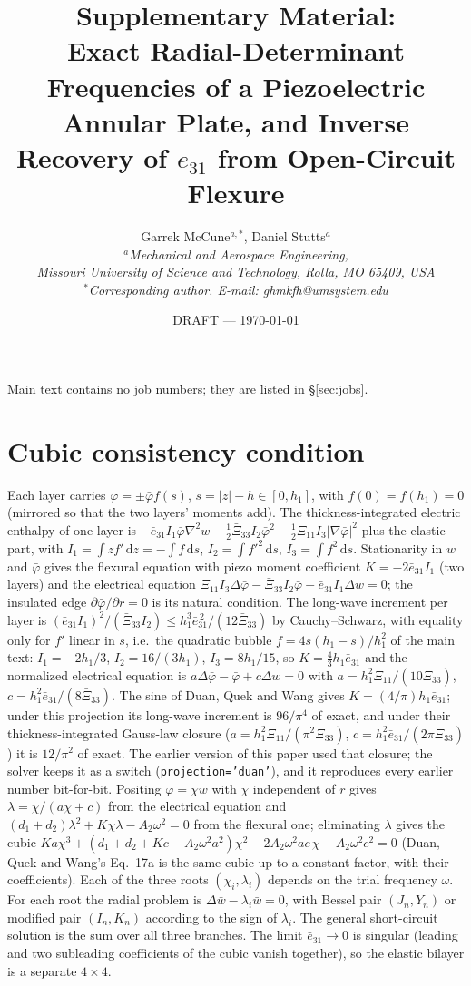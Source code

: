 \documentclass[11pt]{article}
\title{\bfseries Supplementary Material:\\
Exact Radial-Determinant Frequencies of a Piezoelectric Annular Plate,
and Inverse Recovery of $e_{31}$ from Open-Circuit Flexure}
\author{Garrek McCune$^{a,*}$, Daniel Stutts$^{a}$\\
\small\itshape $^a$Mechanical and Aerospace Engineering,\\
Missouri University of Science and Technology, Rolla, MO 65409, USA\\
\small\upshape $^*$Corresponding author. E-mail: ghmkfh@umsystem.edu}
\date{DRAFT --- \today}
\newcommand{\eebar}{\bar{e}_{31}}
\newcommand{\Xibar}{\bar{\Xi}_{33}}
\begin{document}
\maketitle
\noindent Main text contains no job numbers; they are listed in
\S\ref{sec:jobs}.

\section{Cubic consistency condition}
\label{sec:s1}
Each layer carries $\varphi=\pm\bar\varphi f(s)$, $s=\lvert z\rvert-h\in[0,h_1]$,
with $f(0)=f(h_1)=0$ (mirrored so that the two layers' moments add). The
thickness-integrated electric enthalpy of one layer is
$-\eebar I_1\bar\varphi\nabla^2w-\tfrac12\Xibar I_2\bar\varphi^2
-\tfrac12\Xi_{11}I_3\lvert\nabla\bar\varphi\rvert^2$ plus the elastic
part, with $I_1=\int zf'\,\mathrm dz=-\int f\,\mathrm ds$,
$I_2=\int f'^2\,\mathrm ds$, $I_3=\int f^2\,\mathrm ds$. Stationarity in
$w$ and $\bar\varphi$ gives the flexural equation with piezo moment
coefficient $K=-2\eebar I_1$ (two layers) and the electrical equation
$\Xi_{11}I_3\Delta\bar\varphi-\Xibar I_2\bar\varphi-\eebar I_1\Delta
w=0$; the insulated edge $\partial\bar\varphi/\partial r=0$ is its
natural condition. The long-wave increment per layer is
$(\eebar I_1)^2/(\Xibar I_2)\le h_1^3\eebar^{\,2}/(12\Xibar)$ by
Cauchy--Schwarz, with equality only for $f'$ linear in $s$, i.e.\ the
quadratic bubble $f=4s(h_1-s)/h_1^2$ of the main text: $I_1=-2h_1/3$,
$I_2=16/(3h_1)$, $I_3=8h_1/15$, so $K=\tfrac43h_1\eebar$ and the
normalized electrical equation is
$a\Delta\bar\varphi-\bar\varphi+c\Delta w=0$ with
$a=h_1^2\Xi_{11}/(10\Xibar)$, $c=h_1^2\eebar/(8\Xibar)$. The sine of
Duan, Quek and Wang \cite{duan2005} gives $K=(4/\pi)h_1\eebar$; under
this projection its long-wave increment is $96/\pi^4$ of exact, and under
their thickness-integrated Gauss-law closure ($a=h_1^2\Xi_{11}/(\pi^2\Xibar)$,
$c=h_1^2\eebar/(2\pi\Xibar)$) it is $12/\pi^2$ of exact. The earlier
version of this paper used that closure; the solver keeps it as a
switch (\texttt{projection='duan'}), and it reproduces every earlier
number bit-for-bit. Positing $\bar\varphi=\chi\bar w$ with $\chi$
independent of $r$ gives $\lambda=\chi/(a\chi+c)$ from the electrical
equation and $(d_1+d_2)\lambda^2+K\chi\lambda-A_2\omega^2=0$ from the
flexural one; eliminating $\lambda$ gives the cubic
$Ka\chi^3+(d_1+d_2+Kc-A_2\omega^2a^2)\chi^2-2A_2\omega^2ac\,\chi
-A_2\omega^2c^2=0$ (Duan, Quek and Wang's Eq.~17a is the same cubic up
to a constant factor, with their coefficients). Each of the three roots $(\chi_i,\lambda_i)$ depends on
the trial frequency $\omega$. For each root the radial problem is
$\Delta\bar w-\lambda_i\bar w=0$, with Bessel pair $(J_n,Y_n)$ or
modified pair $(I_n,K_n)$ according to the sign of $\lambda_i$. The
general short-circuit solution is the sum over all three branches. The
limit $\eebar\to0$ is singular (leading and two subleading coefficients
of the cubic vanish together), so the elastic bilayer is a separate
$4\times4$.
\end{document}
